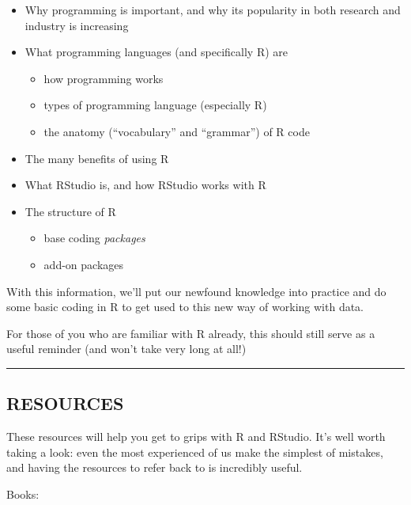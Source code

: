 \documentclass[
]{book}
\providecommand{\tightlist}{%
  \setlength{\itemsep}{0pt}\setlength{\parskip}{0pt}}
\begin{document}
\begin{itemize}
\tightlist
\item
  Why programming is important, and why its popularity in both research
  and industry is increasing
\item
  What programming languages (and specifically R) are

  \begin{itemize}
  \tightlist
  \item
    how programming works
  \item
    types of programming language (especially R)
  \item
    the anatomy (``vocabulary'' and ``grammar'') of R code
  \end{itemize}
\item
  The many benefits of using R
\item
  What RStudio is, and how RStudio works with R
\item
  The structure of R

  \begin{itemize}
  \tightlist
  \item
    base coding \emph{packages}
  \item
    add-on packages
  \end{itemize}
\end{itemize}

With this information, we'll put our newfound knowledge into practice and
do some basic coding in R to get used to this new way of working with data.

For those of you who are familiar with R already, this should still serve as a
useful reminder (and won't take very long at all!)\\
\hspace*{0.333em}

\begin{center}\rule{0.5\linewidth}{0.5pt}\end{center}

\hypertarget{resources}{%
\subsection{RESOURCES}\label{resources}}

These resources will help you get to grips with R and RStudio. It's well worth
taking a look: even the most experienced of us make the simplest of mistakes,
and having the resources to refer back to is incredibly useful.

Books:
\end{document}
